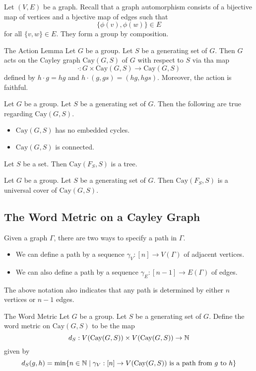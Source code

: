 \documentclass[a4paper]{article}
\begin{document}
Let $(V,E)$ be a graph. Recall that a graph automorphism consists of a bijective map of vertices and a bjective map of edges such that $$\{\phi(v),\phi(w)\}\in E$$ for all $\{v,w\}\in E$. They form a group by composition. 

\begin{lmm}{The Action Lemma}{} Let $G$ be a group. Let $S$ be a generating set of $G$. Then $G$ acts on the Cayley graph $\text{Cay}(G,S)$ of $G$ with respect to $S$ via tha map $$\cdot:G\times\text{Cay}(G,S)\to\text{Cay}(G,S)$$ defined by $h\cdot g=hg$ and $h\cdot (g,gs)=(hg,hgs)$. Moreover, the action is faithful. 
\end{lmm}

\begin{prp}{}{} Let $G$ be a group. Let $S$ be a generating set of $G$. Then the following are true regarding $\text{Cay}(G,S)$. 
\begin{itemize}
\item $\text{Cay}(G,S)$ has no embedded cycles. 
\item $\text{Cay}(G,S)$ is connected. 
\end{itemize}
\end{prp}

\begin{prp}{}{} Let $S$ be a set. Then $\text{Cay}(F_S,S)$ is a tree. 
\end{prp}

\begin{prp}{}{} Let $G$ be a group. Let $S$ be a generating set of $G$. Then $\text{Cay}(F_S,S)$ is a universal cover of $\text{Cay}(G,S)$. 
\end{prp}

\subsection{The Word Metric on a Cayley Graph}
Given a graph $\Gamma$, there are two ways to specify a path in $\Gamma$. 
\begin{itemize}
\item We can define a path by a sequence $\gamma_V:[n]\to V(\Gamma)$ of adjacent vertices. 
\item We can also define a path by a sequence $\gamma_E:[n-1]\to E(\Gamma)$ of edges. 
\end{itemize}

The above notation also indicates that any path is determined by either $n$ vertices or $n-1$ edges. 

\begin{defn}{The Word Metric}{} Let $G$ be a group. Let $S$ be a generating set of $G$. Define the word metric on $\text{Cay}(G,S)$ to be the map $$d_S:V(\text{Cay}(G,S))\times V(\text{Cay}(G,S))\to\mathbb{N}$$ given by $$d_S(g,h)=\min\{n\in\mathbb{N}\;|\;\gamma_V:[n]\to V(\text{Cay}(G,S))\text{ is a path from }g\text{ to }h\}$$
\end{defn}
\end{document}
